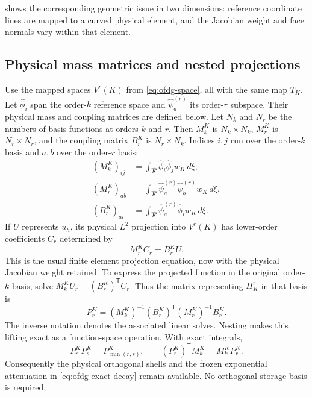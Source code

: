  shows the corresponding geometric issue in two dimensions:
reference coordinate lines are mapped to a curved physical element, and the
Jacobian weight and face normals vary within that element.


\subsection{Physical mass matrices and nested projections}
Use the mapped spaces $V^r(K)$ from \cref{eq:ofdg-space}, all with the same
map $T_K$. Let $\widehat\phi_i$ span the order-$k$ reference space and
$\widehat\psi_a^{(r)}$ its order-$r$ subspace. Their physical mass and coupling
matrices are defined below. Let $N_k$ and $N_r$ be the numbers of basis
functions at orders $k$ and $r$. Then $M_k^K$ is $N_k\times N_k$,
$M_r^K$ is $N_r\times N_r$, and the coupling matrix $B_r^K$ is
$N_r\times N_k$. Indices $i,j$ run over the order-$k$ basis and $a,b$
over the order-$r$ basis:
\begin{align}
 (M_k^K)_{ij}&=\int_{\widehat K}\widehat\phi_i\widehat\phi_j w_K\,d\xi,\\
 (M_r^K)_{ab}&=\int_{\widehat K}
       \widehat\psi_a^{(r)}\widehat\psi_b^{(r)}w_K\,d\xi,\\
 (B_r^K)_{ai}&=\int_{\widehat K}
       \widehat\psi_a^{(r)}\widehat\phi_iw_K\,d\xi.
 \label{eq:curved-weighted-masses}
\end{align}
If $U$ represents $u_h$, its physical $L^2$ projection into $V^r(K)$ has
lower-order coefficients $C_r$ determined by
\begin{equation}
 M_r^K C_r=B_r^K U.
 \label{eq:curved-projection-solve}
\end{equation}
This is the usual finite element projection equation, now with the physical
Jacobian weight retained. To express the projected function in the original
order-$k$ basis, solve $M_k^K U_r=(B_r^K)^{\mathsf T}C_r$. Thus the matrix
representing $\Pi_K^r$ in that basis is
\begin{equation}
 P_r^K=(M_k^K)^{-1}(B_r^K)^{\mathsf T}(M_r^K)^{-1}B_r^K.
 \label{eq:curved-projector-matrix}
\end{equation}
The inverse notation denotes the associated linear solves. Nesting makes
this lifting exact as a function-space operation. With exact integrals,
\begin{equation}
 P_r^KP_s^K=P_{\min(r,s)}^K,\qquad
 (P_r^K)^{\mathsf T}M_k^K=M_k^KP_r^K.
 \label{eq:curved-projector-identities}
\end{equation}
Consequently the physical orthogonal shells and the frozen exponential
attenuation in \cref{eq:ofdg-exact-decay} remain available. No orthogonal
storage basis is required.

